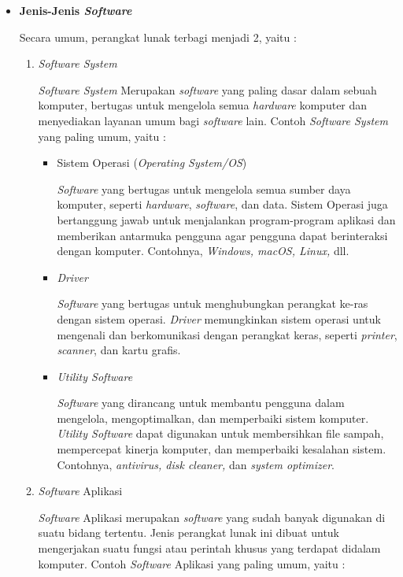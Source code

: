 \documentclass[12pt]{article}
\begin{document}
\begin{itemize}
        \item \textbf{Jenis-Jenis \textit{Software}}
        \par
        Secara umum, perangkat lunak terbagi menjadi 2, yaitu :
        \begin{enumerate}
            \item \textit{Software System}
            \par
            \textit{Software System} Merupakan \textit{software} yang paling dasar dalam sebuah komputer, bertugas untuk mengelola semua \textit{hardware} komputer dan menyediakan layanan umum bagi \textit{software} lain. Contoh \textit{Software System} yang paling umum, yaitu :
            \begin{itemize}
                \item Sistem Operasi (\textit{Operating System/OS})
                \par
                \textit{Software} yang bertugas untuk mengelola semua sumber daya komputer, seperti \textit{hardware}, \textit{software}, dan data. Sistem Operasi juga bertanggung jawab untuk menjalankan program-program aplikasi dan memberikan antarmuka pengguna agar pengguna dapat berinteraksi dengan komputer. Contohnya, \textit{Windows, macOS, Linux,} dll.
                \item \textit{Driver}
                \par 
                \textit{Software} yang bertugas untuk menghubungkan perangkat ke-ras dengan sistem operasi. 
                \textit{Driver} memungkinkan sistem operasi untuk mengenali dan berkomunikasi dengan perangkat keras, seperti \textit{printer}, \textit{scanner}, dan kartu grafis.
                \item \textit{Utility Software}
                \par
                \textit{Software} yang dirancang untuk membantu pengguna dalam mengelola, mengoptimalkan, dan memperbaiki sistem komputer. \textit{Utility Software} dapat digunakan untuk membersihkan file sampah, mempercepat kinerja komputer, dan memperbaiki kesalahan sistem. Contohnya, \textit{antivirus, disk cleaner,} dan \textit{system optimizer}.
            \end{itemize} 
            \item \textit{Software} Aplikasi
            \par
            \textit{Software} Aplikasi merupakan \textit{software} yang sudah banyak digunakan di suatu bidang tertentu. Jenis perangkat lunak ini dibuat untuk mengerjakan suatu fungsi atau perintah khusus yang terdapat didalam komputer. Contoh \textit{Software} Aplikasi yang paling umum, yaitu :

\end{enumerate}
\end{itemize}
\end{document}
